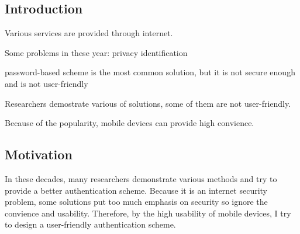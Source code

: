 %
%

\begin{CJK}{Bg5}{bsmi}



\chapter{Introduction}

Various services are provided through internet.

Some problems in these year:
	privacy
	identification

password-based scheme is the most common solution, but it is not secure enough and is not user-friendly



Researchers demostrate various of solutions, some of them are not user-friendly.

Because of the popularity, mobile devices can provide high convience.

\begin{comment}
In the age of information, more and more services are provided through the internet. Thought it brings us a convient daily life, there are some problems emerge. First, the convience of internet make the bondaries between people blur. Therefore, it is an important issue about how to protect our privacy.
The second problem is that
\end{comment}

\section{Motivation}

In these decades, many researchers demonstrate various methods and try to provide a better authentication scheme. Because it is an internet security problem, some solutions put too much emphasis on security so ignore the convience and usability. Therefore, by the high usability of mobile devices, I try to design a user-friendly authentication scheme.


\begin{comment}
As authentication system is an important part in the world of internet. A good authentication system may protect everyone's privacy not be invaded by the malicious person. 
So far, because of the easy design, the password-based scheme is the most common solution about authentication issue. However, there were some researches demontrates that this was not a proper solution in both security and usability. 
\end{comment}



\end{CJK}
